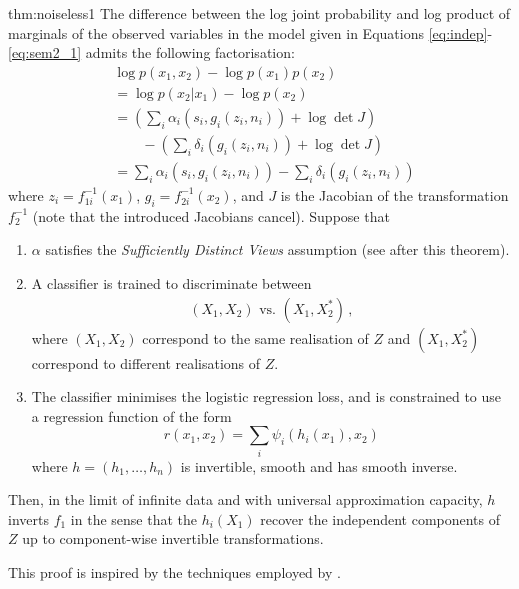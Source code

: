 \begin{reptheorem}{thm:noiseless1}
	The difference between the log joint probability and log product of marginals of the observed variables in the model given in Equations \ref{eq:indep}-\ref{eq:sem2_1} admits the following factorisation:
	\begin{align}
	&\log p({x}_1, {x}_2) - \log p({x}_1) p({x}_2) \nonumber \\
	&= \log p({x}_2 | {x}_1) - \log p({x}_2) \nonumber\\
	&= \left(\sum_i \alpha_i(s_{i}, g_i(z_i, n_i)) + \log \det J \right) \nonumber\\
	&\qquad - \left( \sum_i \delta_i(g_i(z_i, n_i)) + \log \det J\right) \nonumber\\
	&= \sum_i \alpha_i(s_{i}, g_i(z_i, n_i)) - \sum_i \delta_i(g_i(z_i, n_i))\label{eq:logdens_noiesless_1} \,
	\end{align}
	where $z_i=f^{-1}_{1i}({x}_1)$, $g_i=f^{-1}_{2i}({x}_2)$,
	and $J$ is the Jacobian of the transformation $f^{-1}_2$ (note that the introduced Jacobians cancel).
	Suppose that
	\begin{enumerate}
		\item $\alpha$ satisfies the \emph{Sufficiently Distinct Views} assumption (see after this theorem).
		\item A classifier is trained to discriminate between
		\begin{align*}
		(X_{1},X_{2}) \text{ vs. } (X_{1},X_{2}^{*})\,,
		\end{align*}
		where $({X}_{1},{X}_{2})$ correspond to the same realisation of $Z$ and $({X}_{1},{X}_{2}^{*})$ correspond to different realisations of ${Z}$.
		\item The classifier minimises the logistic regression loss, and is constrained to use a regression function of the form
		\begin{equation*}
		r({x}_{1},{x}_{2})=\sum_{i}\psi_{i}(h_{i}({x}_{1}),{x}_{2})
		\end{equation*}
		where ${h} =(h_{1}, \ldots, h_{n})$  is invertible, smooth and has smooth inverse.
	\end{enumerate}
	
	Then, in the limit of infinite data and with universal approximation capacity, $h$ inverts ${f}_1$ in the sense that the $h_{i}(X_1)$ recover the independent components of $Z$ up to component-wise invertible transformations.
\end{reptheorem}

This proof is inspired by the techniques employed by \cite{hyvarinen19a}.

